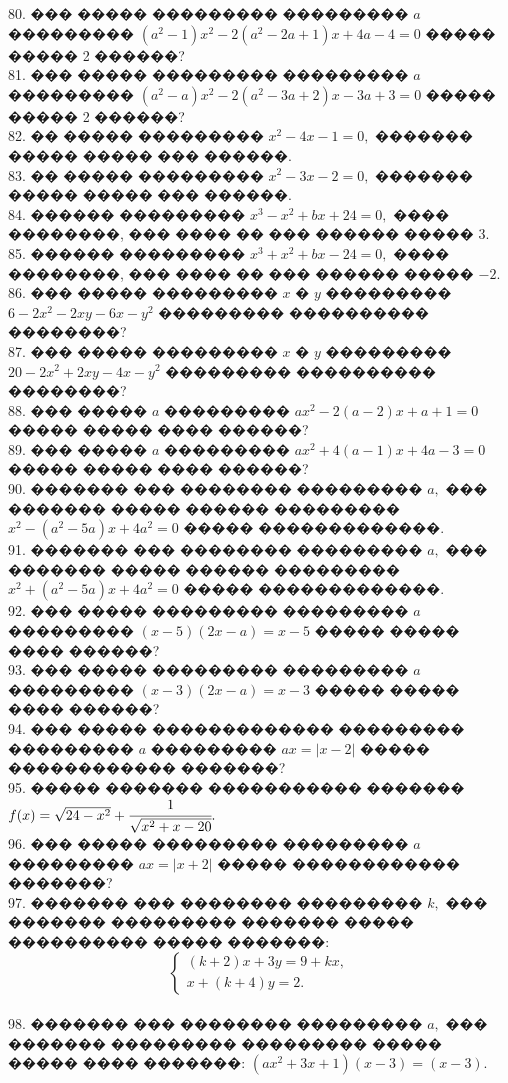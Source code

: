 \documentclass[12pt]{article}
\begin{document}
80. ��� ����� ��������� ��������� $a$ ��������� $(a^2-1)x^2-2(a^2-2a+1)x+4a-4=0$ ����� ����� 2 ������?\\
81. ��� ����� ��������� ��������� $a$ ��������� $(a^2-a)x^2-2(a^2-3a+2)x-3a+3=0$ ����� ����� 2 ������?\\
82. �� ����� ��������� $x^2-4x-1=0,$ ������� ����� ����� ��� ������.\\
83. �� ����� ��������� $x^2-3x-2=0,$ ������� ����� ����� ��� ������.\\
84. ������ ��������� $x^3-x^2+bx+24=0,$ ���� ��������, ��� ���� �� ��� ������ ����� $3.$\\
85. ������ ��������� $x^3+x^2+bx-24=0,$ ���� ��������, ��� ���� �� ��� ������ ����� $-2.$\\
86. ��� ����� ��������� $x$ � $y$ ��������� $6-2x^2-2xy-6x-y^2$ ��������� ���������� ��������?\\
87. ��� ����� ��������� $x$ � $y$ ��������� $20-2x^2+2xy-4x-y^2$ ��������� ���������� ��������?\\
88. ��� ����� $a$ ��������� $ax^2-2(a-2)x+a+1=0$ ����� ����� ���� ������?\\
89. ��� ����� $a$ ��������� $ax^2+4(a-1)x+4a-3=0$ ����� ����� ���� ������?\\
90. ������� ��� �������� ��������� $a,$ ��� ������� ����� ������ ��������� $x^2-(a^2-5a)x+4a^2=0$ ����� �������������.\\
91. ������� ��� �������� ��������� $a,$ ��� ������� ����� ������ ��������� $x^2+(a^2-5a)x+4a^2=0$ ����� �������������.\\
92. ��� ����� ��������� ��������� $a$ ��������� $(x-5)(2x-a)=x-5$ ����� ����� ���� ������?\\
93. ��� ����� ��������� ��������� $a$ ��������� $(x-3)(2x-a)=x-3$ ����� ����� ���� ������?\\
94. ��� ����� ������������� ��������� ��������� $a$ ��������� $ax=|x-2|$ ����� ������������ �������?\\
95. ����� ������� ����������� ������� $f(x)=\sqrt{24-x^2}+\cfrac{1}{\sqrt{x^2+x-20}}.$\\
96. ��� ����� ��������� ��������� $a$ ��������� $ax=|x+2|$ ����� ������������ �������?\\
97. ������� ��� �������� ��������� $k,$ ��� ������� ��������� ������� ����� ���������� ����� �������:
$$\begin{cases}
(k+2)x+3y=9+kx,\\
x+(k+4)y=2.
\end{cases}$$\\
98. ������� ��� �������� ��������� $a,$ ��� ������� ��������� ��������� ����� ����� ���� �������: $(ax^2+3x+1)(x-3)=(x-3).$\\
\end{document}
